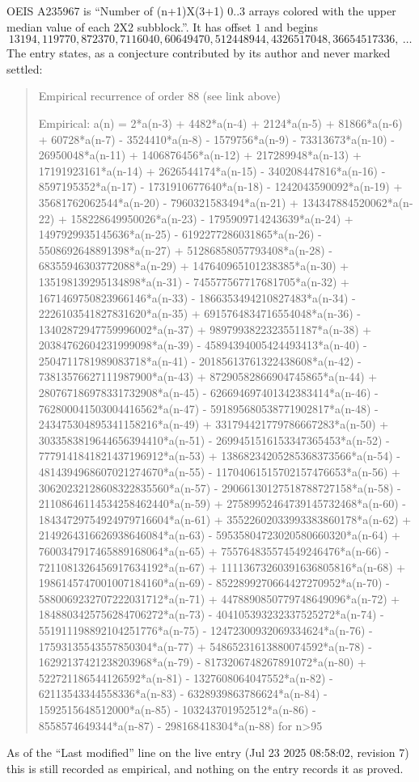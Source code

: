 \documentclass[11pt,a4paper]{article}
\theoremstyle{plain}
\theoremstyle{definition}
\begin{document}
OEIS A235967 is ``Number of (n+1)X(3+1) 0..3 arrays colored with the upper median value of each 2X2 subblock.''. It has offset $1$ and begins
\[
13194, 119770, 872370, 7116040, 60649470, 512448944, 4326517048, 36654517336,\ \dots
\]
The entry states, as a conjecture contributed by its author and never marked settled:
\begin{quote}\raggedright\small
Empirical recurrence of order 88 (see link above)

Empirical: a(n) = 2*a(n-3) + 4482*a(n-4) + 2124*a(n-5) + 81866*a(n-6) + 60728*a(n-7) - 3524410*a(n-8) - 1579756*a(n-9) - 73313673*a(n-10) - 26950048*a(n-11) + 1406876456*a(n-12) + 217289948*a(n-13) + 17191923161*a(n-14) + 2626544174*a(n-15) - 340208447816*a(n-16) - 8597195352*a(n-17) - 1731910677640*a(n-18) - 1242043590092*a(n-19) + 35681762062544*a(n-20) - 7960321583494*a(n-21) + 134347884520062*a(n-22) + 158228649950026*a(n-23) - 1795909714243639*a(n-24) + 1497929935145636*a(n-25) - 6192277286031865*a(n-26) - 5508692648891398*a(n-27) + 51286858057793408*a(n-28) - 68355946303772088*a(n-29) + 147640965101238385*a(n-30) + 135198139295134898*a(n-31) - 745577567717681705*a(n-32) + 1671469750823966146*a(n-33) - 1866353494210827483*a(n-34) - 2226103541827831620*a(n-35) + 6915764834716554048*a(n-36) - 13402872947759996002*a(n-37) + 9897993822323551187*a(n-38) + 20384762604231999098*a(n-39) - 45894394005424493413*a(n-40) - 2504711781989083718*a(n-41) - 20185613761322438608*a(n-42) - 73813576627111987900*a(n-43) + 87290582866904745865*a(n-44) + 280767186978331732908*a(n-45) - 626694697401342383414*a(n-46) - 762800041503004416562*a(n-47) - 591895680538771902817*a(n-48) - 243475304895341158216*a(n-49) + 331794421779786667283*a(n-50) + 3033583819644656394410*a(n-51) - 2699451516153347365453*a(n-52) - 7779141841821437196912*a(n-53) + 13868234205285368373566*a(n-54) - 4814394968607021274670*a(n-55) - 11704061515702157476653*a(n-56) + 30620232128608322835560*a(n-57) - 29066130127518788727158*a(n-58) - 21108646114534258462440*a(n-59) + 27589952464739145732468*a(n-60) - 18434729754924979716604*a(n-61) + 35522602033993383860178*a(n-62) + 2149264316626938646084*a(n-63) - 59535804723020580660320*a(n-64) + 7600347917465889168064*a(n-65) + 755764835574549246476*a(n-66) - 7211081326456917634192*a(n-67) + 11113673260391636805816*a(n-68) + 1986145747001007184160*a(n-69) - 8522899270664427270952*a(n-70) - 5880069232707222031712*a(n-71) + 4478890850779748649096*a(n-72) + 1848803425756284706272*a(n-73) - 404105393232337525272*a(n-74) - 551911198892104251776*a(n-75) - 12472300932069334624*a(n-76) - 17593135543557850304*a(n-77) + 54865231613880074592*a(n-78) - 16292137421238203968*a(n-79) - 8173206748267891072*a(n-80) + 522721186544126592*a(n-81) - 1327608064047552*a(n-82) - 62113543344558336*a(n-83) - 6328939863786624*a(n-84) - 1592515648512000*a(n-85) - 103243701952512*a(n-86) - 8558574649344*a(n-87) - 298168418304*a(n-88) for n>95
\end{quote}
As of the ``Last modified'' line on the live entry (Jul 23 2025 08:58:02, revision 7) this is still
recorded as empirical, and nothing on the entry records it as proved.
\end{document}
